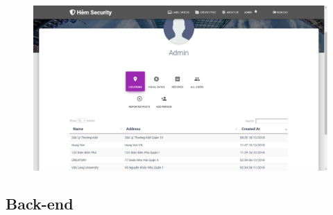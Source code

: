 \begin{figure}[!htb]
\endminipage\hfill
{}
  \includegraphics[width=\linewidth]{images/chap4/admin.png}
\endminipage
\end{figure}
\subsection{Back-end}

